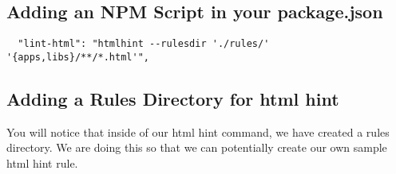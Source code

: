 \subsection{Adding an NPM Script in your package.json}
\begin{verbatim}
  "lint-html": "htmlhint --rulesdir './rules/' '{apps,libs}/**/*.html'",
\end{verbatim}

\subsection{Adding a Rules Directory for html hint}
You will notice that inside of our html hint command, we have created a rules
directory. We are doing this so that we can potentially create our own sample
html hint rule.
